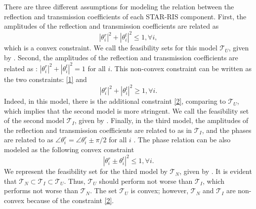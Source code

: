 \documentclass[a4, conference]{IEEEtran}
\theoremstyle{definition}
\begin{document}
There are three different assumptions for modeling the relation between the reflection and transmission coefficients of each STAR-RIS component. First, the amplitudes of the reflection and transmission coefficients are related as \cite[Eq. (2)]{xu2021star}
\begin{equation}\label{1}
|\theta_{i}^{r}|^2+|\theta_{i}^{t}|^2\leq 1, \forall i,
\end{equation}
which is a convex constraint. We call the feasibility sets for this model $\mathcal{T}_{U}$, given by \cite[Eq. (9)]{soleymani2023spectral}. Second, the amplitudes of the reflection and transmission coefficients are related as \cite[Eq. (1)]{liu2021star}: $|\theta_{i}^{r}|^2+|\theta_{i}^{t}|^2= 1$ for all $i$. This non-convex constraint can be written as the two constraints:  \eqref{1} and
\begin{equation}\label{2}
|\theta_{i}^{r}|^2+|\theta_{i}^{t}|^2\geq 1, \forall i.
\end{equation}
Indeed, in this model, there is the additional constraint \eqref{2}, comparing to $\mathcal{T}_{U}$, which implies that the second model is more stringent. We call the feasibility set of the second model $\mathcal{T}_{I}$, given by \cite[Eq. (10)]{soleymani2023spectral}. Finally, in the third model, the amplitudes of the reflection and transmission coefficients are related to as in $\mathcal{T}_{I}$, and the phases are related to as $\angle \theta_{i}^{r}=\angle \theta_{i}^{r}\pm \pi/2$ for all $i$ \cite{9774942, liu2022simultaneously}.
The phase relation can be also modeled as the following convex constraint \cite[Lemma 1]{soleymani2023spectral}
\begin{equation}\label{3}
|\theta_{i}^{r}\pm\theta_{i}^{t}|^2\leq 1, \forall i.
\end{equation}
We represent the feasibility set for the third model by $\mathcal{T}_{N}$, given by \cite[Eq. (11)]{soleymani2023spectral}. It is evident that $\mathcal{T}_{N}\subset\mathcal{T}_{I}\subset\mathcal{T}_{U}$. Thus, $\mathcal{T}_{U}$ should perform not worse than $\mathcal{T}_{I}$, which performs not worse than $\mathcal{T}_{N}$. The set $\mathcal{T}_{U}$ is convex; however, $\mathcal{T}_{N}$ and $\mathcal{T}_{I}$ are non-convex because of the constraint \eqref{2}.
\end{document}
